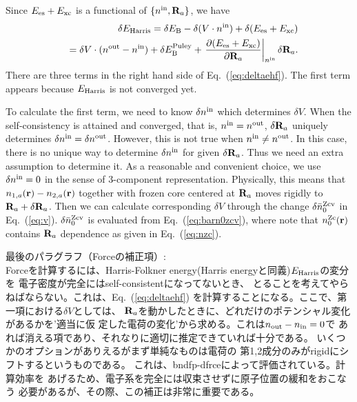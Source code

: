 \documentclass[twocolumn,showpacs,preprintnumbers,amsmath,amssymb,floatfix]{revtex4-1}
\newcommand{\bfr}{{\bf r}}
\newcommand{\bfR}{{\bf R}}
\newcommand{\req}[1]{\mbox{Eq.~\!(\ref{#1})}}
\def\nzc{n^{\rm Zc}}
\def\barnzcv{\bar{n}^{\rm Zcv}}
\def\ehf{E_{\rm Harris}}
\def\nin{n^{\rm in}}
\def\nout{n^{\rm out}}
\def\Vin{V}
\begin{document}
\begin{widetext}
Since $E_{\rm es} + E_{\rm xc}$ is a functional of $\{\nin,\bfR_a\}$, we have
\begin{eqnarray}
&&\delta \ehf = \delta E_{\rm B} - \delta (\Vin \cdot \nin) 
  + \delta (E_{\rm es} + E_{\rm xc}) \nonumber \\
&&= \delta \Vin \cdot (\nout- \nin) 
  + \delta E_{\rm B}^{\rm Puley} 
  + \left.\frac{\partial (E_{\rm es} + E_{\rm xc})}{\partial \bfR_a}\right|_{\nin} \delta \bfR_a.
\label{eq:deltaehf} 
\end{eqnarray}
There are three terms in the right hand side of \req{eq:deltaehf}.
The first term appears because $\ehf$ is not converged yet.

To calculate the first term, we need to know $\delta \nin$ which determines
$\delta \Vin$. When the self-consistency is attained and converged,
that is, $\nin=\nout$, $\delta \bfR_a$ uniquely determines
$\delta \nin=\delta \nout$.
However, this is not true when $\nin \ne \nout$.
In this case, there is no unique way to determine $\delta \nin$
for given $\delta \bfR_a$. Thus we need an extra assumption to
determine it. As a reasonable and convenient choice,
we use $\delta \nin=0$ in the sense of 3-component representation. 
Physically, this means that $n_{1,a}(\bfr)-n_{2,a}(\bfr)$  
together with frozen core centered at $\bfR_a$
moves rigidly to $\bfR_a+\delta\bfR_a$.
Then we can calculate corresponding $\delta \Vin$ through the change
$\delta \barnzcv_0$ in \req{eq:v}. $\delta \barnzcv_0$ is evaluated from
\req{eq:barn0zcv},
where note that $\nzc_0(\bfr)$ contains $\bfR_a$ dependence as
given in \req{eq:nzc}.

最後のパラグラフ（Forceの補正項）:\\
Forceを計算するには、Harris-Folkner energy(Harris energyと同義)$E_{\rm Harris}$の変分を
電子密度が完全にはself-consistentになってないとき、
とることを考えてやらねばならない。これは、\req{eq:deltaehf} 
を計算することになる。ここで、第一項における$\delta V$としては、
$\bfR_a$を動かしたときに、どれだけのポテンシャル変化があるかを'適当に仮
定した電荷の変化'から求める。これは$n_{\rm out}-n_{\rm in}=0$で
あれば消える項であり、それなりに適切に推定できていれば十分である。
いくつかのオプションがありえるがまず単純なものは電荷の
第1,2成分のみがrigidにシフトするというものである。
これは、bndfp-dfrceによって評価されている。計算効率を
あげるため、電子系を完全には収束させずに原子位置の緩和をおこなう
必要があるが、その際、この補正は非常に重要である。


\end{widetext}
\end{document}
